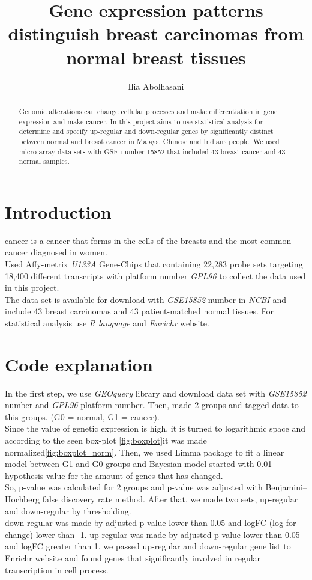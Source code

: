 \documentclass[journal, a4paper]{IEEEtran}
\begin{document}
	\title{Gene expression patterns distinguish breast carcinomas from normal breast tissues}
	\author{Ilia Abolhasani}
	\maketitle

\begin{abstract}
	Genomic alterations can change cellular processes and make differentiation in gene expression and make cancer. In this project aims to use statistical analysis for determine and specify up-regular and down-regular genes by significantly distinct between normal and breast cancer in Malays, Chinese and Indians people. We used micro-array data sets with GSE number 15852 that included 43 breast cancer and 43 normal samples.
\end{abstract}

\section{Introduction}
	 cancer is a cancer that forms in the cells of the breasts and the most common cancer diagnosed in women.
    \\Used Affy-metrix  \textit{U133A} Gene-Chips that containing 22,283 probe sets targeting 18,400 different transcripts with platform number  \textit{GPL96} to collect the data used in this project.
    \\The data set is available for download with \textit{GSE15852} number in  \textit{NCBI} and include 43 breast carcinomas and 43 patient-matched normal tissues.
    For statistical analysis use  \textit{R language} and  \textit{Enrichr} website.
\section{Code explanation}
	In the first step, we use \textit{GEOquery} library and download data set with \textit{GSE15852} number and \textit{GPL96} platform number. Then, made 2 groups and tagged data to this groups. (G0 = normal, G1 = cancer).
	\\Since the value of genetic expression is high, it is turned to logarithmic space and according to the seen box-plot \figurename{\ref{fig:boxplot}}it was made normalized\figurename{\ref{fig:boxplot_norm}}.
	Then, we used Limma package to fit a linear model between G1 and G0 groups and Bayesian model started with 0.01 hypothesis value for the amount of genes that has changed.
	\\So, p-value was calculated for 2 groups and p-value was adjusted
	 with Benjamini–Hochberg false discovery rate method.
	After that, we made two sets, up-regular and down-regular by thresholding.
	\\down-regular was made by adjusted p-value lower than 0.05 and logFC (log for change) lower than -1.
	up-regular was made by adjusted p-value lower than 0.05 and logFC greater
	than 1.
	we passed up-regular and down-regular gene list to Enrichr website and found genes that significantly involved in regular transcription in cell process.
\end{document}

